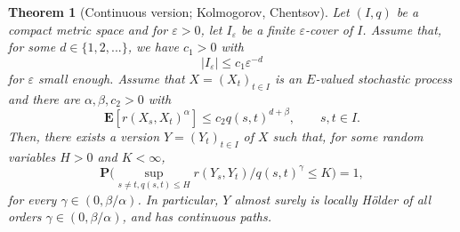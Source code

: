 \documentclass{article}
\newtheorem{theorem}{Theorem}
\theoremstyle{definition}
\theoremstyle{step} \newtheorem{step}{Step}
\begin{document}
\begin{theorem}[Continuous version; Kolmogorov, Chentsov]
  \label{T:kolchen_general}
  Let $(I, q)$ be a compact metric space and for $\varepsilon>0$, let $I_\varepsilon$ be a finite $\varepsilon$-cover of $I$. Assume that, for some $d \in \{1,2,...\}$, we have $c_1>0$ with
  $$|I_\varepsilon| \leq c_1\varepsilon^{-d}$$
  for $\varepsilon$ small enough. Assume that $X = (X_t)_{t\in I}$ is an $E$-valued stochastic process and there are $\alpha, \beta, c_2>0$ with
  $$ \mathbf E[r(X_s, X_t)^\alpha] \leq c_2 q(s,t)^{d+\beta}, \qquad
    s,t\in I.$$ Then, there exists a version $Y = (Y_t)_{t\in I}$ of
  $X$ such that, for some random variables $H>0$ and $K<\infty$,
  $$ \mathbf P\Big(\sup_{s\neq t, q(s,t) \leq H} r(Y_s,
    Y_t)/q(s,t)^\gamma \leq K\Big) = 1,
  $$ for every $\gamma\in(0,\beta/\alpha)$. In particular, $Y$ almost
  surely is locally Hölder of all orders $\gamma\in(0,\beta/\alpha)$,
  and has continuous paths.
\end{theorem}
\end{document}
